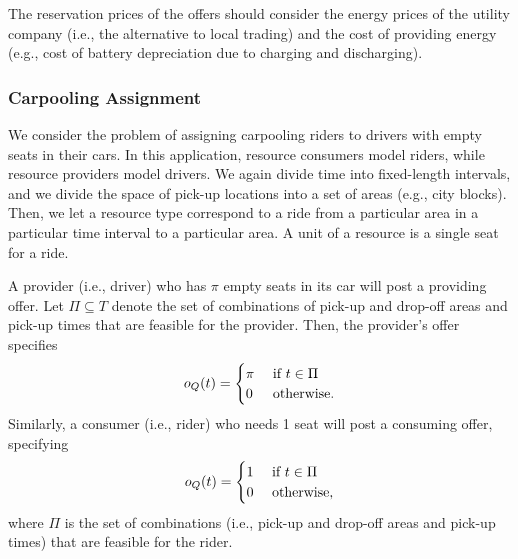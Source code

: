 The reservation prices of the offers should consider the energy prices of the utility company (i.e., the alternative to local trading) and %
the cost of providing energy (e.g., cost of battery depreciation due to charging and discharging).



\subsubsection{Carpooling Assignment}
\label{sec:carpoolingprob}
We consider the problem of assigning carpooling riders to drivers with empty seats in their cars.
In this application, resource consumers model riders, while resource providers model drivers.
We again divide time into fixed-length intervals, and we divide the space of pick-up locations into a set of areas (e.g., city blocks).
Then, we let a resource type correspond to a ride from a particular area in a particular time interval to a particular area. 
A unit of a resource is a single seat for a ride.

A provider (i.e., driver) who has $\pi$ empty seats in its car will post a providing offer. 
Let $\Pi \subseteq T$ denote the set of   combinations of pick-up and drop-off areas and pick-up times that are feasible for the provider.
Then, the provider's offer specifies
\begin{equation}
    o_Q(t) = \begin{cases}
    \pi & \textnormal{ if } t \in \Pi \\
    0 & \textnormal{ otherwise.}
    \end{cases}
\end{equation}
Similarly, a consumer (i.e., rider) who needs 1 seat will post a consuming offer, specifying
\begin{equation}
    o_Q(t) = \begin{cases}
    1 & \textnormal{ if } t \in \Pi \\
    0 & \textnormal{ otherwise,}
    \end{cases}
\end{equation}
where $\Pi$ is the set of combinations (i.e., pick-up and drop-off areas and pick-up times) that are feasible for the rider.

